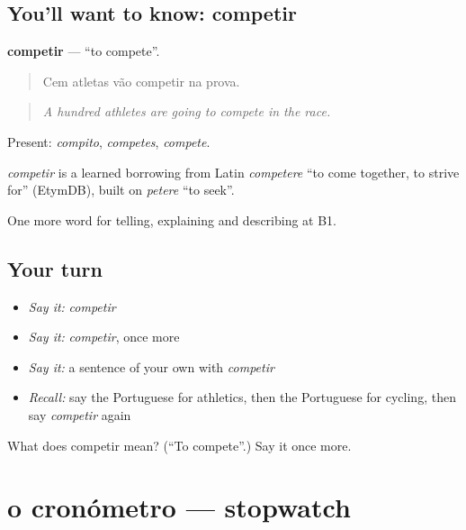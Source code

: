 \subsection*{You'll want to know: competir}
\textbf{competir} — \textquotedblleft{}to compete\textquotedblright{}.

\begin{quote}
Cem atletas vão competir na prova.
\end{quote}

\begin{quote}
\emph{A hundred athletes are going to compete in the race.}
\end{quote}

Present: \emph{compito}, \emph{competes}, \emph{compete}.

\begin{cousinweb}
\emph{competir} is a learned borrowing from Latin \emph{competere} \textquotedblleft{}to come together, to strive for\textquotedblright{} (EtymDB), built on \emph{petere} \textquotedblleft{}to seek\textquotedblright{}.
\end{cousinweb}

\begin{grammarlens}[title={What you've built}]
One more word for telling, explaining and describing at B1.
\end{grammarlens}

\subsection*{Your turn}
\begin{itemize}
\raggedright
  \item \emph{Say it:} \emph{competir}
  \item \emph{Say it:} \emph{competir}, once more
  \item \emph{Say it:} a sentence of your own with \emph{competir}
  \item \emph{Recall:} say the Portuguese for athletics, then the Portuguese for cycling, then say \emph{competir} again
\end{itemize}

\begin{tcolorbox}[breakable,colback=teal!4,colframe=teal!35!black,title={Before you move on}]
What does competir mean? (\textquotedblleft{}To compete\textquotedblright{}.) Say it once more.
\end{tcolorbox}
\section[o cronómetro]{o cronómetro — stopwatch}

